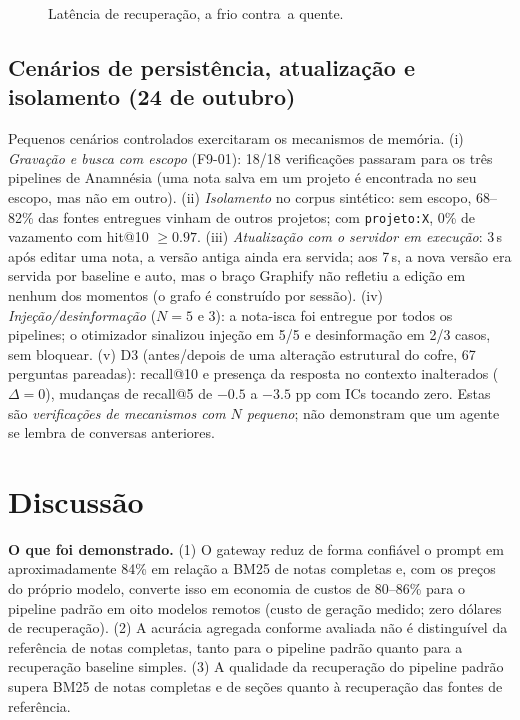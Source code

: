 \documentclass[conference,onecolumn,11pt]{IEEEtran}
\newcommand{\anam}{Anam\-n\'esia}
\begin{document}
\begin{figure}[!htbp]\centering
{}
\caption{Latência de recuperação, a frio contra\ a quente.}\label{fig:lat}
\end{figure}

\subsection{Cenários de persistência, atualização e isolamento (24 de outubro)}
Pequenos cenários controlados exercitaram os mecanismos de memória. (i) \emph{Gravação e busca com escopo} (F9-01): 18/18 verificações passaram para os três pipelines de \anam{} (uma nota salva em um projeto é encontrada no seu escopo, mas não em outro). (ii) \emph{Isolamento} no corpus sintético: sem escopo, 68--82\% das fontes entregues vinham de outros projetos; com \texttt{projeto:X}, 0\% de vazamento com hit@10 $\ge0.97$. (iii) \emph{Atualização com o servidor em execução}: 3\,s após editar uma nota, a versão antiga ainda era servida; aos 7\,s, a nova versão era servida por baseline e auto, mas o braço Graphify não refletiu a edição em nenhum dos momentos (o grafo é construído por sessão). (iv) \emph{Injeção/desinformação} ($N{=}5$ e 3): a nota-isca foi entregue por todos os pipelines; o otimizador sinalizou injeção em 5/5 e desinformação em 2/3 casos, sem bloquear. (v) D3 (antes/depois de uma alteração estrutural do cofre, 67 perguntas pareadas): recall@10 e presença da resposta no contexto inalterados ($\Delta=0$), mudanças de recall@5 de $-0.5$ a $-3.5$ pp com ICs tocando zero. Estas são \emph{verificações de mecanismos com $N$ pequeno}; não demonstram que um agente se lembra de conversas anteriores.

\FloatBarrier
\section{Discussão}
\textbf{O que foi demonstrado.} (1) O gateway reduz de forma confiável o prompt em aproximadamente 84\% em relação a BM25 de notas completas e, com os preços do próprio modelo, converte isso em economia de custos de 80--86\% para o pipeline padrão em oito modelos remotos (custo de geração medido; zero dólares de recuperação). (2) A acurácia agregada conforme avaliada não é distinguível da referência de notas completas, tanto para o pipeline padrão quanto para a recuperação baseline simples. (3) A qualidade da recuperação do pipeline padrão supera BM25 de notas completas e de seções quanto à recuperação das fontes de referência.
\end{document}
